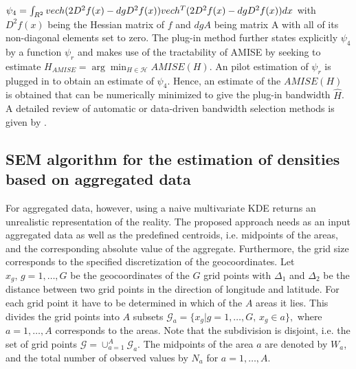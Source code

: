 $\psi_4 = \int_{R^2} vech(2D^2f(x) - d gD^2 f(x)) vech^T(2D^2f(x) - d gD^2 f(x))d x$ with $D^2f(x)$ being the Hessian matrix of $f$ and $d gA$ being matrix A with all of its non-diagonal elements set to zero. 
The plug-in method further states explicitly $\psi_4$ by a function $\psi_r$ and makes use of the tractability of AMISE by seeking to estimate 
$H_{AMISE} = \arg \min_{H \in \mathcal{H}} AMISE(H)$.
An pilot estimation of $\psi_r$ is plugged in to obtain an estimate of $\psi_4$. Hence, an estimate of the $AMISE(H)$ is obtained that can be numerically minimized to give the plug-in bandwidth $\hat{H}$.   \\
A detailed review of automatic or data-driven bandwidth selection methods is given by \cite{Sperlich2013}. 


\hypertarget{SEM-algorithm-for-the-estimation-of-densities-based-on-aggregated-data}{%
\subsection{SEM algorithm for the estimation of densities based on aggregated data}\label{SEM-algorithm-for-the-estimation-of-densities-based-on-aggregated-data}}

For aggregated data, however, using a naive multivariate KDE returns an unrealistic representation of the reality. The proposed approach needs as an input aggregated data as well as the predefined centroids, i.e. midpoints of the areas, and the corresponding absolute value of the aggregate. 
Furthermore, the grid size corresponds to the specified discretization of the geocoordinates. Let $x_g,\, g = 1, \dots, G$ be the geocoordinates of the $G$ grid points with $\Delta_1$ and $\Delta_2$ be the distance between two grid points in the direction of longitude and latitude. 
For each grid point it have to be determined in which of the $A$ areas it lies. This divides the grid points into $A$ subsets $\mathcal{G}_a = \{x_g | g = 1, \dots, G,\, x_g \in a \},$ where $a = 1,\dots,A$ corresponds to the areas. Note that the subdivision is disjoint, i.e. the set of grid points $\mathcal{G} = \cup_{a=1}^A \mathcal{G}_a$. 
The midpoints of the area $a$ are denoted by $W_a$, and the total number of observed values by $N_a$ for $a = 1, \dots,A$.

